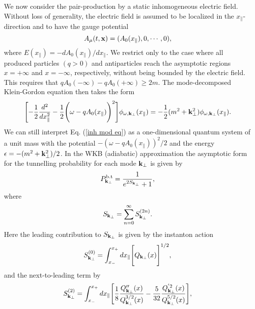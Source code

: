 \documentclass[a4paper,prd,showpacs,preprintnumbers,amsmath,amssymb]{revtex4}
\begin{document}
We now consider the pair-production by a static inhomogeneous
electric field. Without loss of generality, the electric field is
assumed to be localized in the $x_{\parallel}$-direction and to
have the gauge potential
\begin{equation}
A_{\mu} (t, {\bf x}) = ( A_0 (x_{\parallel}), 0, \cdots, 0),
\end{equation}
where $E (x_{\parallel}) = - d A_0
(x_{\parallel})/dx_{\parallel}$. We restrict only to the case
where all produced particles $(q > 0)$ and antiparticles reach the
asymptotic regions $x = + \infty$ and $x = - \infty$,
respectively, without being bounded by the electric field. This
requires that $q A_0 (- \infty) - q A_0 (+ \infty) \geq 2m$. The
mode-decomposed Klein-Gordon equation then takes the form
\begin{equation}
\Biggl[- \frac{1}{2} \frac{d^2}{dx_{\parallel}^2} -
\frac{1}{2}\Biggl(\omega - q A_0 ( x_{\parallel}) \Biggr)^2
\Biggr] \phi_{\omega, {\bf k}_{\perp}} (x_{\parallel}) = -
\frac{1}{2}(m^2 + {\bf k}_{\perp}^2) \phi_{\omega, {\bf
k}_{\perp}} (x_{\parallel}). \label{inh mod eq}
\end{equation}
We can still interpret Eq. (\ref{inh mod eq}) as a one-dimensional
quantum system of a unit mass with the potential $- (\omega - q
A_0 ( x_{\parallel}))^2/2$ and the energy $\epsilon = - (m^2 +
{\bf k}_{\perp}^2)/2$. In the WKB (adiabatic) approximation the
asymptotic form for the tunnelling probability for each mode ${\bf
k}_{\perp}$ is given by \cite{fro,fro2,ben}
\begin{equation}
P^{\rm b.t}_{{\bf k}_{\perp}} = \frac{1}{e^{2 S_{{\bf k}_{\perp}}}
+1},
\end{equation}
where
\begin{equation}
S_{{\bf k}_{\perp}} = \sum_{n=0}^{\infty} S^{(2n)}_{{\bf
k}_{\perp}}.
\end{equation}
Here the leading contribution to $S_{{\bf k}_{\perp}}$ is given by
the instanton action
\begin{equation}
S^{(0)}_{{\bf k}_{\perp}} =  \int_{x_-}^{x_+} dx_{\parallel}
\Biggl[ Q_{{\bf k}_{\perp}}(x) \Biggr]^{1/2}, \label{inh inst}
\end{equation}
and the next-to-leading term by
\begin{equation}
S^{(2)}_{{\bf k}_{\perp}} = \int_{x_-}^{x_+} dx_{\parallel}
\Biggl[\frac{1}{8}\frac{Q_{{\bf k}_{\perp}}''(x)}{Q^{3/2}_{{\bf
k}_{\perp}}(x)} - \frac{5}{32}\frac{Q^{'2}_{{\bf
k}_{\perp}}(x)}{Q^{5/2}_{{\bf k}_{\perp}}(x)} \Biggr],
\end{equation}
\end{document}
